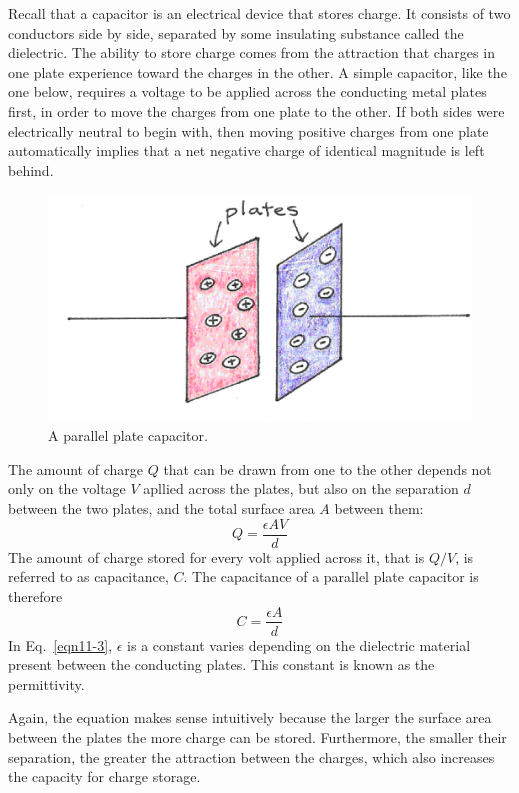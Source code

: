 Recall that a capacitor is an electrical device that stores charge.  It consists of two conductors side by side, separated by some insulating substance called the dielectric. The ability to store charge comes from the attraction that charges in one plate experience toward the charges in the other. A simple capacitor, like the one below, requires a voltage to be applied across the conducting metal plates first, in order to move the charges from one plate to the other.  If both sides were electrically neutral to begin with, then moving positive charges from one plate automatically implies that a net negative charge of identical magnitude is left behind. 
\begin{figure}[!htb]
	\centering
	\includegraphics[width=4.5in]{./figures/Topic11/Fig11-9.png}
	\caption{A parallel plate capacitor.}
	\label{Fig11-9}
\end{figure}
The amount of charge $Q$ that can be drawn from one to the other depends not only on the voltage $V$ apllied across the plates, but also on the separation $d$ between the two plates, and the total surface area $A$ between them:  
$$Q=\frac{\epsilon AV}{d}$$
The amount of charge stored for every volt applied across it, that is $Q/V$, is referred to as capacitance, $C$. The capacitance of a parallel plate capacitor is therefore 
\begin{equation}\label{eqn11-3}
C=\frac{\epsilon A}{d}
\end{equation}
In Eq.~\ref{eqn11-3}, $\epsilon$ is a constant varies depending on the dielectric material present between the conducting plates. This constant is known as the permittivity.

Again, the equation makes sense intuitively because the larger the surface area between the plates the more charge can be stored. Furthermore, the smaller their separation, the greater the attraction between the charges, which also increases the capacity for charge storage.

